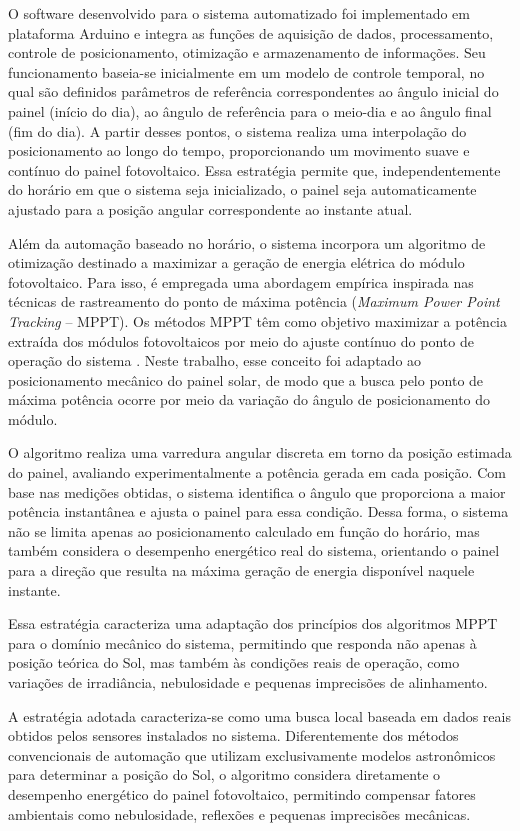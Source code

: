 O software desenvolvido para o sistema automatizado foi implementado em plataforma Arduino e integra as funções de aquisição de dados, processamento, controle de posicionamento, otimização e armazenamento de informações. Seu funcionamento baseia-se inicialmente em um modelo de controle temporal, no qual são definidos parâmetros de referência correspondentes ao ângulo inicial do painel (início do dia), ao ângulo de referência para o meio-dia e ao ângulo final (fim do dia). A partir desses pontos, o sistema realiza uma interpolação do posicionamento ao longo do tempo, proporcionando um movimento suave e contínuo do painel fotovoltaico. Essa estratégia permite que, independentemente do horário em que o sistema seja inicializado, o painel seja automaticamente ajustado para a posição angular correspondente ao instante atual.

Além da automação baseado no horário, o sistema incorpora um algoritmo de otimização destinado a maximizar a geração de energia elétrica do módulo fotovoltaico. Para isso, é empregada uma abordagem empírica inspirada nas técnicas de rastreamento do ponto de máxima potência (\textit{Maximum Power Point Tracking} -- MPPT). Os métodos MPPT têm como objetivo maximizar a potência extraída dos módulos fotovoltaicos por meio do ajuste contínuo do ponto de operação do sistema \cite{Esram2007}. Neste trabalho, esse conceito foi adaptado ao posicionamento mecânico do painel solar, de modo que a busca pelo ponto de máxima potência ocorre por meio da variação do ângulo de posicionamento do módulo.

O algoritmo realiza uma varredura angular discreta em torno da posição estimada do painel, avaliando experimentalmente a potência gerada em cada posição. Com base nas medições obtidas, o sistema identifica o ângulo que proporciona a maior potência instantânea e ajusta o painel para essa condição. Dessa forma, o sistema não se limita apenas ao posicionamento calculado em função do horário, mas também considera o desempenho energético real do sistema, orientando o painel para a direção que resulta na máxima geração de energia disponível naquele instante.

Essa estratégia caracteriza uma adaptação dos princípios dos algoritmos MPPT para o domínio mecânico do sistema, permitindo que responda não apenas à posição teórica do Sol, mas também às condições reais de operação, como variações de irradiância, nebulosidade e pequenas imprecisões de alinhamento.

A estratégia adotada caracteriza-se como uma busca local baseada em dados reais obtidos pelos sensores instalados no sistema. Diferentemente dos métodos convencionais de automação que utilizam exclusivamente modelos astronômicos para determinar a posição do Sol, o algoritmo considera diretamente o desempenho energético do painel fotovoltaico, permitindo compensar fatores ambientais como nebulosidade, reflexões e pequenas imprecisões mecânicas.


